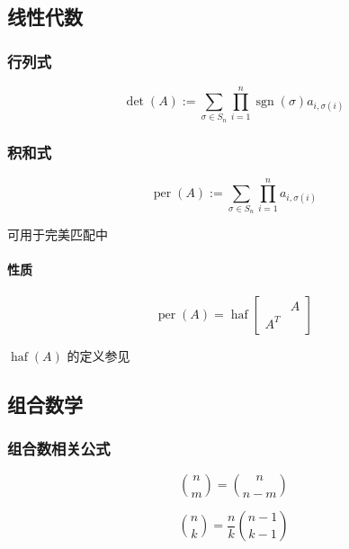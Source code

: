 \subsection{线性代数}

\subsubsection{行列式}

\begin{equation}
    \operatorname{det}(A):=\sum_{\sigma\in S_n}\prod_{i=1}^n \operatorname{sgn}(\sigma) a_{i,\sigma(i)}
\end{equation}

\subsubsection{积和式}

\begin{equation}
    \operatorname{per}(A):=\sum_{\sigma\in S_n}\prod_{i=1}^n a_{i,\sigma(i)}
\end{equation}

可用于完美匹配中

\paragraph{性质}

\begin{equation}
    \operatorname{per}(A)=\operatorname{haf}\begin{bmatrix}
            & A \\
        A^T &
    \end{bmatrix}
\end{equation}

\(\operatorname{haf}(A)\) 的定义参见 

\subsection{组合数学}

\subsubsection{组合数相关公式}

\begin{equation}
    \binom{n}{m}=\binom{n}{n-m}
\end{equation}

\begin{equation}
    \binom{n}{k} = \frac{n}{k} \binom{n-1}{k-1}
\end{equation}

